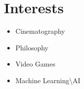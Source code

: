 \documentclass[letterpaper,11pt]{article}
\newcommand{\resumeSubHeadingListEnd}{\end{itemize}}
\begin{document}

\section{Interests}
\vspace{-2pt}
    \begin{multicols}{4}
        \begin{itemize}[itemsep=-5pt, parsep=3pt]
            \item\small Cinematography
            \item Philosophy
            \item Video Games
            \item Machine Learning\textbackslash{AI}
        \end{itemize}
    \end{multicols}
    \vspace*{2.0\multicolsep}
\end{document}
